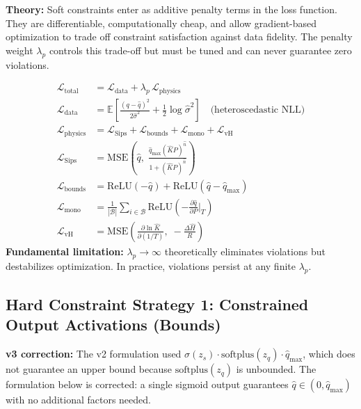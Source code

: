 \documentclass[12pt,a4paper]{article}
\begin{document}
\begin{mathbox}
\textbf{Theory:} Soft constraints enter as additive penalty terms in
the loss function. They are differentiable, computationally cheap,
and allow gradient-based optimization to trade off constraint
satisfaction against data fidelity. The penalty weight $\lambda_p$
controls this trade-off but must be tuned and can never guarantee
zero violations.

\begin{align}
\mathcal{L}_{\text{total}} &= \mathcal{L}_{\text{data}}
  + \lambda_p\,\mathcal{L}_{\text{physics}} \\[4pt]
\mathcal{L}_{\text{data}} &= \mathbb{E}\!\left[
  \frac{(q - \hat{q})^2}{2\hat{\sigma}^2}
  + \tfrac{1}{2}\log\hat{\sigma}^2\right]
  \quad\text{(heteroscedastic NLL)} \\[4pt]
\mathcal{L}_{\text{physics}} &= \mathcal{L}_{\text{Sips}}
  + \mathcal{L}_{\text{bounds}}
  + \mathcal{L}_{\text{mono}}
  + \mathcal{L}_{\text{vH}} \\[4pt]
\mathcal{L}_{\text{Sips}} &= \mathrm{MSE}\!\left(\hat{q},\;
  \frac{\hat{q}_{\max}(\hat{K}P)^{\hat{n}}}{1+(\hat{K}P)^{\hat{n}}}
  \right) \\[4pt]
\mathcal{L}_{\text{bounds}} &= \mathrm{ReLU}(-\hat{q})
  + \mathrm{ReLU}(\hat{q} - \hat{q}_{\max}) \\[4pt]
\mathcal{L}_{\text{mono}} &= \frac{1}{|\mathcal{B}|}
  \sum_{i\in\mathcal{B}} \mathrm{ReLU}\!\left(
  -\frac{\partial\hat{q}}{\partial P}\bigg|_T\right) \\[4pt]
\mathcal{L}_{\text{vH}} &= \mathrm{MSE}\!\left(
  \frac{\partial\ln\hat{K}}{\partial(1/T)},\;
  -\frac{\Delta\hat{H}}{R}\right)
\end{align}
\textbf{Fundamental limitation:} $\lambda_p \to \infty$ theoretically
eliminates violations but destabilizes optimization.
In practice, violations persist at any finite $\lambda_p$.
\end{mathbox}

\subsection{Hard Constraint Strategy 1: Constrained Output Activations (Bounds)}

\begin{changebox}
\textbf{v3 correction:} The v2 formulation used $\sigma(z_s)\cdot\mathrm{softplus}(z_q)\cdot\hat{q}_{\max}$, which does not guarantee an upper bound because $\mathrm{softplus}(z_q)$ is unbounded. The formulation below is corrected: a single sigmoid output guarantees $\hat{q}\in(0,\hat{q}_{\max})$ with no additional factors needed.
\end{changebox}
\end{document}

